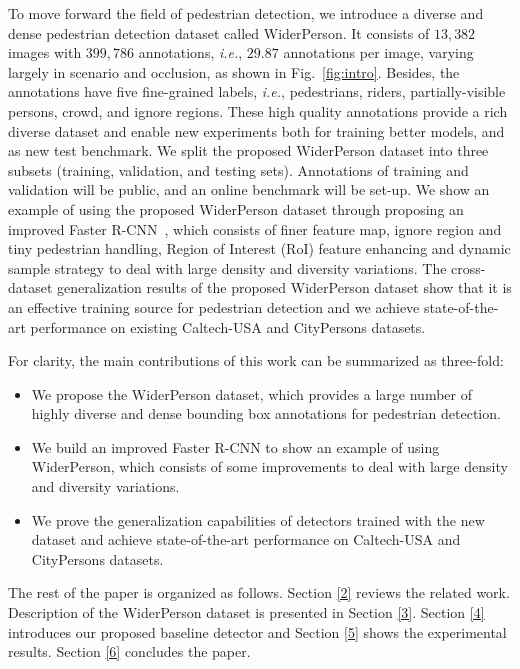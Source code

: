 \documentclass[journal]{IEEEtran}
\def\ie{{\em i.e.}}
\begin{document}
To move forward the field of pedestrian detection, we introduce a diverse and dense pedestrian detection dataset called WiderPerson. It consists of $13,382$ images with $399,786$ annotations, \ie, $29.87$ annotations per image, varying largely in scenario and occlusion, as shown in Fig.~\ref{fig:intro}. Besides, the annotations have five fine-grained labels, \ie, pedestrians, riders, partially-visible persons, crowd, and ignore regions. These high quality annotations provide a rich diverse dataset and enable new experiments both for training better models, and as new test benchmark. We split the proposed WiderPerson dataset into three subsets (training, validation, and testing sets). Annotations of training and validation will be public, and an online benchmark will be set-up. We show an example of using the proposed WiderPerson dataset through proposing an improved Faster R-CNN~\cite{DBLP:journals/pami/RenHG017}, which consists of finer feature map, ignore region and tiny pedestrian handling, Region of Interest (RoI) feature enhancing and dynamic sample strategy to deal with large density and diversity variations. The cross-dataset generalization results of the proposed WiderPerson dataset show that it is an effective training source for pedestrian detection and we achieve state-of-the-art performance on existing Caltech-USA and CityPersons datasets. 

For clarity, the main contributions of this work can be summarized as three-fold:
\begin{itemize}
\item We propose the WiderPerson dataset, which provides a large number of highly diverse and dense bounding box annotations for pedestrian detection. 
\item We build an improved Faster R-CNN to show an example of using WiderPerson, which consists of some improvements to deal with large density and diversity variations.
\item We prove the generalization capabilities of detectors trained with the new dataset and achieve state-of-the-art performance on Caltech-USA and CityPersons datasets.
\end{itemize}

The rest of the paper is organized as follows. Section \ref{2} reviews the related work. Description of the WiderPerson dataset is presented in Section \ref{3}. Section \ref{4} introduces our proposed baseline detector and Section \ref{5} shows the experimental results. Section \ref{6} concludes the paper.
\end{document}
